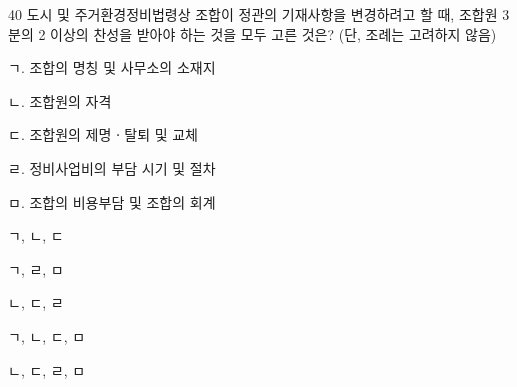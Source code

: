 \begin{question}{40}
도시 및 주거환경정비법령상 조합이 정관의 기재사항을 변경하려고 할 때, 조합원 3분의 2 이상의 찬성을 받아야 하는 것을 모두 고른 것은? (단, 조례는 고려하지 않음)
\begin{framedtext}
ㄱ. 조합의 명칭 및 사무소의 소재지 \par
ㄴ. 조합원의 자격 \par
ㄷ. 조합원의 제명ㆍ탈퇴 및 교체 \par
ㄹ. 정비사업비의 부담 시기 및 절차 \par
ㅁ. 조합의 비용부담 및 조합의 회계 \par
\end{framedtext}
\begin{choices}
  \item ㄱ, ㄴ, ㄷ
  \item ㄱ, ㄹ, ㅁ
  \item ㄴ, ㄷ, ㄹ
  \item ㄱ, ㄴ, ㄷ, ㅁ
  \item ㄴ, ㄷ, ㄹ, ㅁ
\end{choices}
\end{question}
